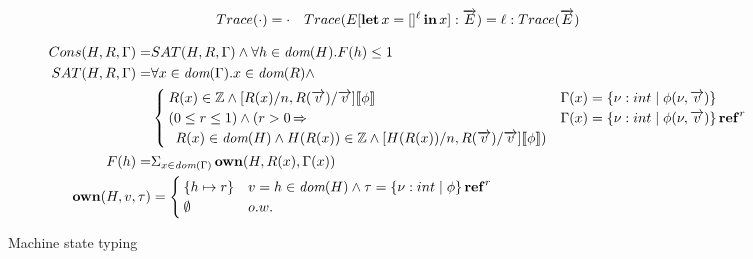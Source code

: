 \documentclass[runningheads]{llncs}
\begin{document}
\begin{figure}
  \leavevmode

  \begin{align*}
    Trace(\cdot) = \cdot && Trace(E[\operatorname{\mathbf{let}} x = []^{\ell} \operatorname{\mathbf{in}} x] : \overrightarrow{E}) = \ell : Trace(\overrightarrow{E})
  \end{align*}

  \begin{align*}
    Cons(H,R,\tenv) = & SAT(H,R,\tenv) \wedge \forall h \in \DOM(H).F(h) \leq 1 \\
    SAT(H,R,\tenv) = & \forall x \in \DOM(\tenv).x \in \DOM(R) \wedge \\
    & \begin{cases}
      R(x) \in \mathbb{Z} \wedge [R(x)/n,R(\seq{v})/\seq{v}]\denote{\phi} & \tenv(x) = \{ \nu : int \mid \phi(\nu,\seq{v}) \} \\
      (0 \leq r \leq 1) \wedge (r > 0 \produces & \tenv(x) =  \{ \nu : int \mid \phi(\nu,\seq{v}) \} \TREF^r \\
      \,\,\,R(x) \in \DOM(H) \wedge H(R(x)) \in \mathbb{Z} \wedge [H(R(x))/n,R(\seq{v})/\seq{v}]\denote{\phi}) &
    \end{cases} \\
\iffalse                     \Big[\tenv(x) & = \{ n : int \mid \phi(n) \} \produces \Big] \wedge \\
    \Big[\tenv(x)  & =  \{ n : int \mid \phi(n) \} \TREF^r \produces \\
                    & (0 \leq r \leq 1) \wedge (r > 0 \produces R(x) \in \DOM(H) \wedge H(R(x)) \in \mathbb{Z} \wedge [H(R(x))/n]\denote{\phi})\Big] \\\fi
    F(h) = &  \Sigma_{x \in \DOM(\tenv)}\,\mathbf{own}(H,R(x),\tenv(x)) \\
    \mathbf{own}(H, v, \typ) &  = \begin{cases}
      \{ h \mapsto r \} & v = h \in \DOM(H) \wedge \typ = \{ \nu: int \mid \phi \} \TREF^r \\
      \emptyset & o.w.
    \end{cases}
  \end{align*}
\caption{Machine state typing}
\label{fig:state-typing}
\end{figure}
\end{document}
